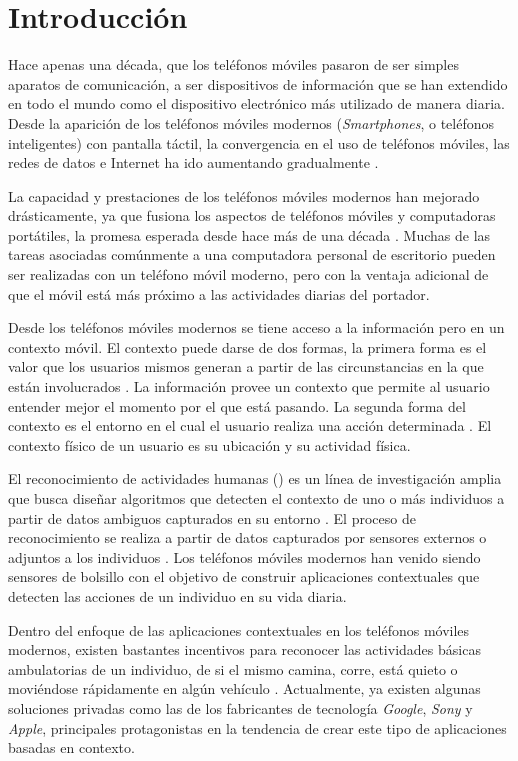 
\chapter{Introducción}

\label{chap:introduccion}

Hace apenas una década, que los teléfonos móviles pasaron de ser simples
aparatos de comunicación, a ser dispositivos de información que se
han extendido en todo el mundo como el dispositivo electrónico más
utilizado de manera diaria. Desde la aparición de los teléfonos móviles
modernos (\emph{Smartphones}, o teléfonos inteligentes) con pantalla
táctil, la convergencia en el uso de teléfonos móviles, las redes
de datos e Internet ha ido aumentando gradualmente \cite{Fling2009}.

La capacidad y prestaciones de los teléfonos móviles modernos han
mejorado drásticamente, ya que fusiona los aspectos de teléfonos móviles
y computadoras portátiles, la promesa esperada desde hace más de una
década \cite{Tanenbaum2010}. Muchas de las tareas asociadas comúnmente
a una computadora personal de escritorio pueden ser realizadas con
un teléfono móvil moderno, pero con la ventaja adicional de que el
móvil está más próximo a las actividades diarias del portador.

Desde los teléfonos móviles modernos se tiene acceso a la información
pero en un contexto móvil. El contexto puede darse de dos formas,
la primera forma es el valor que los usuarios mismos generan a partir
de las circunstancias en la que están involucrados \cite{Fling2009}.
La información provee un contexto que permite al usuario entender
mejor el momento por el que está pasando. La segunda forma del contexto
es el entorno en el cual el usuario realiza una acción determinada
\cite{Fling2009}. El contexto físico de un usuario es su ubicación
y su actividad física. 

El reconocimiento de actividades humanas () es un línea
de investigación amplia que busca diseñar algoritmos que detecten
el contexto de uno o más individuos a partir de datos ambiguos capturados
en su entorno \cite{Bao2004}. El proceso de reconocimiento se realiza
a partir de datos capturados por sensores externos o adjuntos a los
individuos \cite{LaraLabrador2013,Chen2012}. Los teléfonos móviles
modernos han venido siendo sensores de bolsillo con el objetivo de
construir aplicaciones contextuales que detecten las acciones de un
individuo en su vida diaria. 

Dentro del enfoque de las aplicaciones contextuales en los teléfonos
móviles modernos, existen bastantes incentivos para reconocer las
actividades básicas ambulatorias de un individuo, de si el mismo camina,
corre, está quieto o moviéndose rápidamente en algún vehículo \cite{CampuzanoLopez2015,Google2013l}.
Actualmente, ya existen algunas soluciones privadas como las de los
fabricantes de tecnología \emph{Google}, \emph{Sony} y \emph{Apple},
principales protagonistas en la tendencia de crear este tipo de aplicaciones
basadas en contexto.

